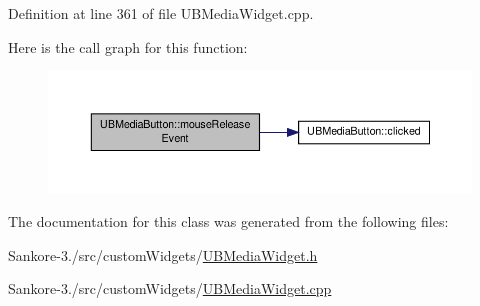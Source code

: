Definition at line 361 of file U\-B\-Media\-Widget.\-cpp.



Here is the call graph for this function\-:
\nopagebreak
\begin{figure}[H]
\begin{center}
\leavevmode
\includegraphics[width=350pt]{d2/d86/class_u_b_media_button_af195ae4937bf0a3f4046172311f79056_cgraph}
\end{center}
\end{figure}




The documentation for this class was generated from the following files\-:\begin{DoxyCompactItemize}
\item 
Sankore-\/3./src/custom\-Widgets/\hyperlink{_u_b_media_widget_8h}{U\-B\-Media\-Widget.\-h}\item 
Sankore-\/3./src/custom\-Widgets/\hyperlink{_u_b_media_widget_8cpp}{U\-B\-Media\-Widget.\-cpp}\end{DoxyCompactItemize}
